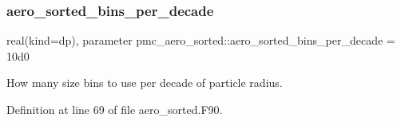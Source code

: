 \mbox{\label{namespacepmc__aero__sorted_acb40c5cb90b0ff373c45a7558bcca305}} 
\subsubsection{\texorpdfstring{aero\+\_\+sorted\+\_\+bins\+\_\+per\+\_\+decade}{aero\_sorted\_bins\_per\_decade}}
{\footnotesize\ttfamily real(kind=dp), parameter pmc\+\_\+aero\+\_\+sorted\+::aero\+\_\+sorted\+\_\+bins\+\_\+per\+\_\+decade = 10d0}



How many size bins to use per decade of particle radius. 



Definition at line 69 of file aero\+\_\+sorted.\+F90.

